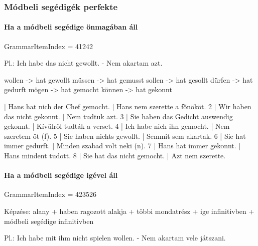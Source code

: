 \documentclass{article}
\newenvironment{desc}{\verbatim}{\endverbatim}
\newenvironment{exmp}{\verbatim}{\endverbatim}
\begin{document}
\subsubsection{Módbeli segédigék perfekte}

\paragraph{Ha a módbeli segédige önmagában áll}

GrammarItemIndex = 41242

\begin{desc}
Pl.: Ich habe das nicht gewollt. - Nem akartam azt.

wollen -> hat gewollt
müssen -> hat gemusst
sollen -> hat gesollt
dürfen -> hat gedurft
mögen -> hat gemocht
können -> hat gekonnt
\end{desc}

\begin{exmp}
1 | Hans hat nich der Chef gemocht. | Hans nem szerette a főnököt.
2 | Wir haben das nicht gekonnt. | Nem tudtuk azt.
3 | Sie haben das Gedicht auswendig gekonnt. | Kívülről tudták a verset.
4 | Ich habe nich ihn gemocht. | Nem szeretem őt (f).
5 | Sie haben nichts gewollt. | Semmit sem akartak.
6 | Sie hat immer gedurft. | Minden szabad volt neki (n).
7 | Hans hat immer gekonnt. | Hans mindent tudott.
8 | Sie hat das nicht gemocht. | Azt nem szerette.
\end{exmp}

\paragraph{Ha a módbeli segédige igével áll}

GrammarItemIndex = 423526

\begin{desc}
Képzése:
alany + haben ragozott alakja + többi mondatrész + ige infinitivben + módbeli segédige infinitivben

Pl.: Ich habe mit ihm nicht spielen wollen. - Nem akartam vele játszani.
\end{desc}
\end{document}
